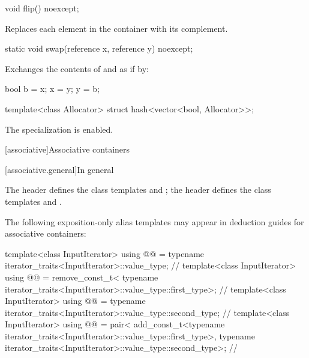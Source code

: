 %
\begin{itemdecl}
void flip() noexcept;
\end{itemdecl}

\begin{itemdescr}
\pnum
\effects Replaces each element in the container with its complement.
\end{itemdescr}

%
\begin{itemdecl}
static void swap(reference x, reference y) noexcept;
\end{itemdecl}

\begin{itemdescr}
\pnum
\effects Exchanges the contents of  and  as if by:

\begin{codeblock}
bool b = x;
x = y;
y = b;
\end{codeblock}

\end{itemdescr}

\begin{itemdecl}
template<class Allocator> struct hash<vector<bool, Allocator>>;
\end{itemdecl}

\begin{itemdescr}
\pnum
The specialization is enabled.
\end{itemdescr}

[associative]{Associative containers}

[associative.general]{In general}

\pnum
The header  defines the class templates  and
; the header  defines the class templates
 and .

\pnum
The following exposition-only alias templates may appear in deduction guides for associative containers:
\begin{codeblock}
template<class InputIterator>
  using @@ =
    typename iterator_traits<InputIterator>::value_type;                // \expos
template<class InputIterator>
  using @@ = remove_const_t<
    typename iterator_traits<InputIterator>::value_type::first_type>;   // \expos
template<class InputIterator>
  using @@ =
    typename iterator_traits<InputIterator>::value_type::second_type;   // \expos
template<class InputIterator>
  using @@ = pair<
    add_const_t<typename iterator_traits<InputIterator>::value_type::first_type>,
    typename iterator_traits<InputIterator>::value_type::second_type>;  // \expos
\end{codeblock}

